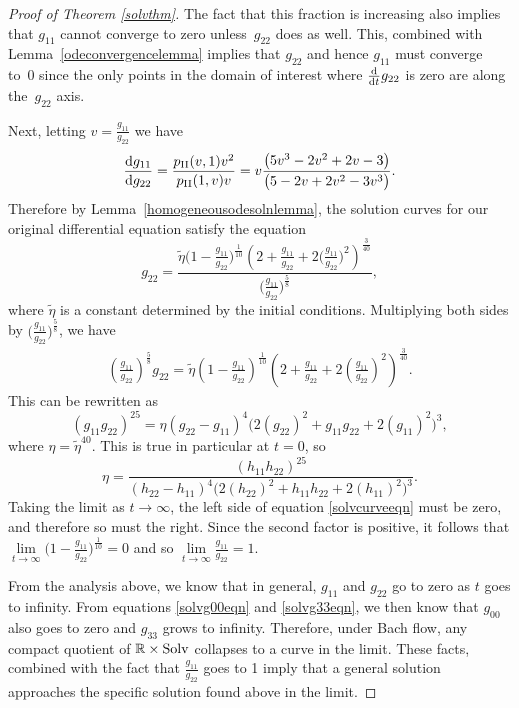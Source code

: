 \documentclass[pdftex]{sigma}
\numberwithin{equation}{section}
\newcommand{\dtime}{\frac{{\rm d}}{{\rm d} t}} %
\begin{document}
\begin{proof}[Proof of Theorem \ref{solvthm}]
The fact that this fraction is increasing also implies that $g_{11}$ cannot converge to zero unless~$g_{22}$ does as well. This, combined with Lemma~\ref{odeconvergencelemma} implies that $g_{22}$ and hence $g_{11}$ must converge to~0 since the only points in the domain of interest where $\dtime g_{22}$ is zero are along the~$g_{22}$ axis.

Next, letting $v = \frac{g_{11}}{g_{22}}$ we have
\begin{gather*}
\frac{{\rm d} g_{11}}{{\rm d} g_{22}} = \frac{p_{\rm II}(v, 1) v^2}{p_{\rm II}(1, v) v}
		 = v \frac{\big(5v^3 - 2v^2 + 2v- 3\big)}{\big(5 - 2v + 2v^2 - 3v^3\big)}.
\end{gather*}
Therefore by Lemma~\ref{homogeneousodesolnlemma}, the solution curves for our original differential equation satisfy the equation
\[
g_{22} = \frac{\tilde{\eta} \big(1-\frac{g_{11}}{g_{22}}\big)^{\frac{1}{10}}
		\left(2 + \frac{g_{11}}{g_{22}} + 2\big(\frac{g_{11}}{g_{22}}\big)^2\right)^{\frac{3}{40}}}				{\big(\frac{g_{11}}{g_{22}}\big)^{\frac{5}{8}}},
\]
where $\tilde{\eta}$ is a constant determined by the initial conditions.
Multiplying both sides by $\big(\frac{g_{11}}{g_{22}}\big)^{\frac{5}{8}}$, we have
\begin{gather} \label{solvcurveeqn}
\left(\frac{g_{11}}{g_{22}}\right)^{\frac{5}{8}} g_{22}
		= \tilde{\eta} \left(1-\frac{g_{11}}{g_{22}}\right)^{\frac{1}{10}}
		\left(2 + \frac{g_{11}}{g_{22}} + 2\left(\frac{g_{11}}{g_{22}}\right)^2\right)^{\frac{3}{40}}.
\end{gather}
This can be rewritten as
\begin{equation*}
(g_{11} g_{22})^{25} = \eta (g_{22}-g_{11})^{4} \big(2(g_{22})^2 + g_{11} g_{22} + 2(g_{11})^2\big)^{3},
\end{equation*}
where $\eta = \tilde{\eta}^{40}$. This is true in particular at $t = 0$, so
\[
\eta = \frac{(h_{11} h_{22})^{25}}{(h_{22}-h_{11})^{4}
				\big(2(h_{22})^2 + h_{11} h_{22} + 2(h_{11})^2\big)^{3}}.
\]
Taking the limit as $t \rightarrow \infty$, the left side of equation \eqref{solvcurveeqn} must be zero, and therefore so must the right. Since the second factor is positive, it follows that $\lim\limits_{t \rightarrow \infty}\big(1-\frac{g_{11}}{g_{22}}\big)^{\frac{1}{10}} = 0$ and so $\lim\limits_{t \rightarrow \infty} \frac{g_{11}}{g_{22}} = 1$.

From the analysis above, we know that in general, $g_{11}$ and $g_{22}$ go to zero as $t$ goes to infinity. From equations \eqref{solvg00eqn} and \eqref{solvg33eqn}, we then know that $g_{00}$ also goes to zero and $g_{33}$ grows to infinity. Therefore, under Bach flow, any compact quotient of $\mathbb{R} \times {\rm Solv}$ collapses to a curve in the limit. These facts, combined with the fact that $\frac{g_{11}}{g_{22}}$ goes to 1 imply that a general solution approaches the specific solution found above in the limit.
\end{proof}
\end{document}
